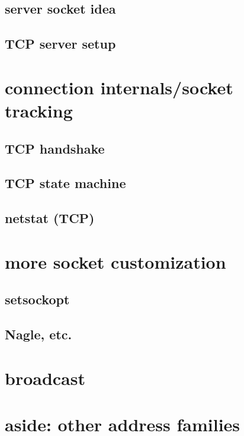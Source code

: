 \subsection{server socket idea}


\subsection{TCP server setup}


\section{connection internals/socket tracking}
\subsection{TCP handshake}


\subsection{TCP state machine}


\subsection{netstat (TCP)}


\section{more socket customization}
\subsection{setsockopt}


\subsection{Nagle, etc.}


\section{broadcast}


\section{aside: other address families}

